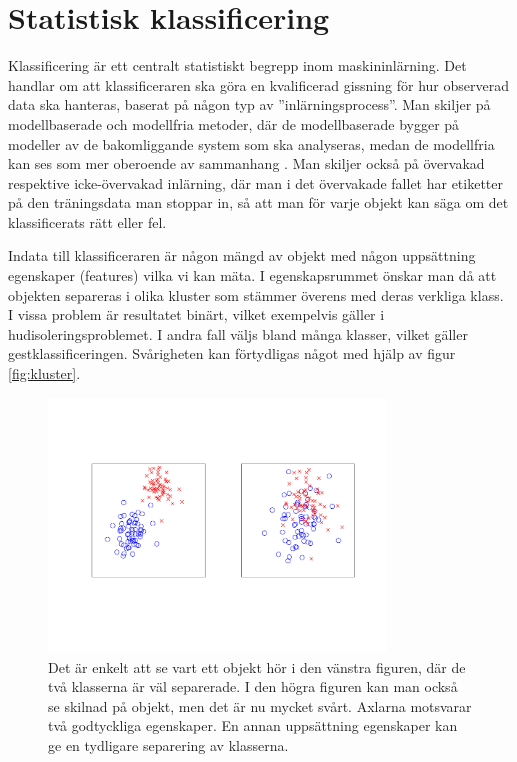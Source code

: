 \documentclass[../rapport_MVEX01-11-05]{subfiles}
\begin{document}
\section{Statistisk klassificering}\label{sec:klassificering}

Klassificering är ett centralt statistiskt begrepp inom maskininlärning.
Det handlar om att klassificeraren ska göra en kvalificerad gissning för hur
observerad data ska hanteras, baserat på någon typ av ''inlärningsprocess''.
Man skiljer på modellbaserade och modellfria metoder, där de modellbaserade
bygger på modeller av de bakomliggande system som ska analyseras, medan de
modellfria kan ses som mer oberoende av sammanhang \cite{Hastie09}.
Man skiljer också på övervakad respektive icke-övervakad inlärning,
där man i det övervakade fallet har etiketter på den träningsdata man stoppar
in, så att man för varje objekt kan säga om det klassificerats rätt eller
fel.

Indata till klassificeraren är någon mängd av objekt med någon uppsättning
egenskaper (features) vilka vi kan mäta.
I egenskapsrummet önskar man då att objekten separeras i olika kluster
som stämmer överens med deras verkliga klass.
I vissa problem är resultatet binärt,
vilket exempelvis gäller i hudisoleringsproblemet.
I andra fall väljs bland många klasser, vilket gäller gestklassificeringen.
Svårigheten kan förtydligas något med hjälp av figur \vref{fig:kluster}.
\begin{figure}[!htpb]
    \begin{center}
\includegraphics[width=0.8\textwidth,clip=true,trim=2cm 3cm 1.5cm 3cm]{bilder/kluster.pdf}
    \end{center}
    \caption{Det är enkelt att se vart ett objekt hör i den vänstra figuren,
    där de två klasserna är väl separerade. I den högra figuren kan man också se
    skilnad på objekt, men det är nu mycket svårt. Axlarna motsvarar
    två godtyckliga egenskaper. En annan uppsättning egenskaper kan ge en
    tydligare separering av klasserna.}
    \label{fig:kluster}
\end{figure}
\end{document}
